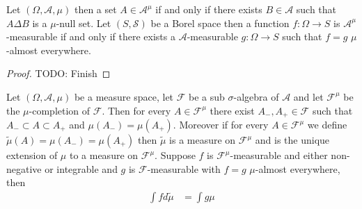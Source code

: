 \begin{lem}\label{CompletionOfSigmaAlgebra}Let $(\Omega, \mathcal{A}, \mu)$ then a set $A \in \mathcal{A}^\mu$ if and only if there exists $B \in \mathcal{A}$ such that $A \Delta B$ is a $\mu$-null set.  Let $(S, \mathcal{S})$ be a Borel space then a function $f : \Omega \to S$ is $\mathcal{A}^\mu$-measurable if and only if there exists a $\mathcal{A}$-measurable $g : \Omega \to S$ such that $f = g$ $\mu$-almost everywhere.
\end{lem}
\begin{proof}
TODO: Finish
\end{proof}

\begin{lem}\label{CompletionOfMeasure}Let $(\Omega, \mathcal{A}, \mu)$ be a measure space, let
  $\mathcal{F}$ be a sub $\sigma$-algebra of $\mathcal{A}$ and let
  $\mathcal{F}^{\mu}$ be the $\mu$-completion of $\mathcal{F}$.  Then
  for every $A \in \mathcal{F}^{\mu}$ there exist $A_-, A_+ \in
  \mathcal{F}$ such that $A_- \subset A \subset A_+$ and $\mu(A_-) = \mu(A_+)$.
Moreover if for every $A \in \mathcal{F}^{\mu}$ we define $\tilde{\mu}(A) = \mu(A_-) = \mu(A_+)$ then
$\tilde{\mu}$ is a measure on $\mathcal{F}^{\mu}$ and is the unique extension
of $\mu$ to a measure on $\mathcal{F}^{\mu}$.  Suppose $f$ is $\mathcal{F}^\mu$-measurable and either non-negative or integrable and $g$ is $\mathcal{F}$-measurable with
$f = g$ $\mu$-almost everywhere, then
\begin{align*}
\int f d \tilde{\mu} &= \int g \mu
\end{align*}
\end{lem}
